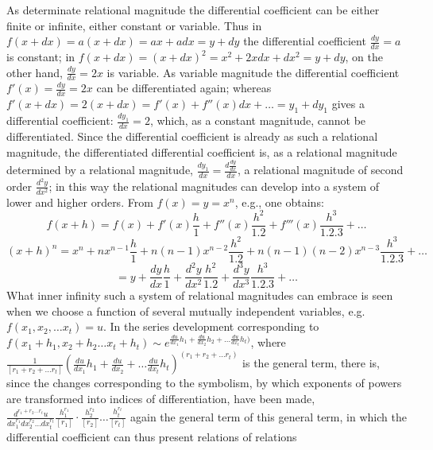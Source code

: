 \documentclass[12pt,a4paper,openany]{book}
\newcommand{\opage}[1]{\marginnote{\footnotesize\textit{[#1]}}}
\begin{document}
As determinate relational magnitude the differential coefficient can
be either finite or infinite, either constant or
variable. Thus in $f(x+dx)=a(x+dx)=ax+adx=y+dy$ the differential coefficient $\frac{dy}{dx}=a$ is constant; in $f(x+dx)=(x+dx)^{2}=x^{2}+2xdx+dx^{2}=y+dy$, on the other hand, $\frac{dy}{dx}=2x$ is variable. As variable magnitude the
differential coefficient $f'(x)=\frac{dy}{dx}=2x$ can be differentiated again;
whereas $f'(x+dx)=2(x+dx)=f'(x)+f''(x)dx+\ldots=y_{1}+dy_{1}$ gives a differential coefficient: $\frac{dy_{1}}{dx}=2$, which, as a constant
magnitude, cannot be differentiated. Since the differential coefficient is already as such a relational magnitude, the
differentiated differential coefficient is, as a relational magnitude determined by a relational
\setcounter{footnote}{0}%
\opage{86}magnitude, $\frac{dy_{1}}{dx}=\frac{d\frac{dy}{dx}}{dx}$, a relational magnitude
of second order $\frac{d^{2}y}{dx^{2}}$; in this way the
relational magnitudes can develop into a system of lower and
higher orders. From $f(x)=y=x^{n}$, e.g., one obtains:
\[ f(x+h)=f(x)+f'(x)\frac{h}{1}+f''(x)\frac{h^{2}}{1.2}+f'''(x)\frac{h^{3}}{1.2.3}+\ldots \]
\[ (x+h)^{n}=x^{n}+nx^{n-1}\frac{h}{1}+n(n-1)x^{n-2}\frac{h^{2}}{1.2}+n(n-1)(n-2)x^{n-3}\frac{h^{3}}{1.2.3}+\ldots \]
\[ =y+\frac{dy}{dx}\frac{h}{1}+\frac{d^{2}y}{dx^{2}}\frac{h^{2}}{1.2}+\frac{d^{3}y}{dx^{3}}\frac{h^{3}}{1.2.3}+\ldots \]
What inner infinity such a system of relational magnitudes
can embrace is seen when we choose a function of
several mutually independent variables, e.g. $f(x_{1},x_{2},\ldots x_{t})=u$. In the series development corresponding to $f(x_{1}+h_{1},x_{2}+h_{2}\ldots x_{t}+h_{t})\sim e^{\frac{du}{dx_{1}}h_{1}+\frac{du}{dx_{2}}h_{2}+\ldots\frac{du}{dx_{t}}h_{t})}$, where %
$\frac{1}{[r_{1}+r_{2}+\ldots r_{t}]}\left(\frac{du}{dx_{1}}h_{1}+\frac{du}{dx_{2}}+\ldots\frac{du}{dx_{t}}h_{t}\right)^{(r_{1}+r_{2}+\ldots r_{t})}$ is the
general term, there is, since the changes corresponding to the symbolism,
by which exponents of powers are transformed into indices of differentiation,
have been made, $\frac{d^{r_{1}+r_{2}\ldots r_{t}}u}{dx_{1}^{r_{1}}dx_{2}^{r_{2}}\ldots dx_{t}^{r_{t}}}\frac{h_{1}^{r_{1}}}{[r_{1}]}\cdot\frac{h_{2}^{r_{2}}}{[r_{2}]}\ldots\frac{h_{t}^{r_{t}}}{[r_{t}]}$ again the general term of this general term, in which
the differential coefficient can thus present relations of relations
\end{document}
